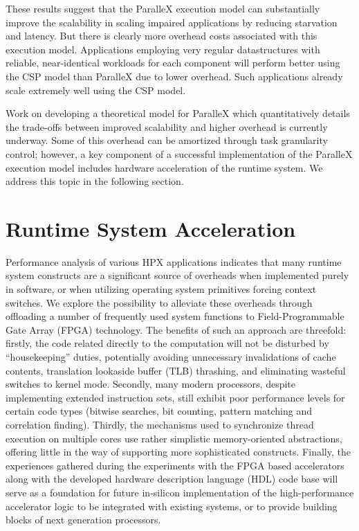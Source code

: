 \documentclass{revtex4}
\begin{document}
These results suggest that the ParalleX execution model can substantially improve the scalability in 
scaling impaired applications by reducing starvation and latency.  But there is clearly more
overhead costs associated with this execution model.  Applications employing very regular datastructures
with reliable, near-identical workloads for each component will perform better using the CSP model than
ParalleX due to lower overhead.  Such applications already scale extremely well using the CSP model.

Work on developing a theoretical model for ParalleX
which quantitatively details the trade-offs between improved scalability and higher overhead is
currently underway.  Some of this overhead can be amortized through task granularity control; however, 
a key component of a successful implementation of the ParalleX execution model 
includes hardware acceleration of the runtime system.  We address this topic in the following section.

\section{Runtime System Acceleration}
\label{sec:implications}

Performance analysis of various HPX applications indicates that many runtime
system constructs are a significant source of overheads when implemented
purely in software, or when utilizing operating system primitives forcing
context switches.  We explore the possibility to alleviate these overheads through offloading a number of
frequently used system functions to Field-Programmable Gate Array (FPGA) technology.
The benefits of such an approach are threefold: firstly, the code related
directly to the computation will not be disturbed by ``housekeeping'' duties,
potentially avoiding unnecessary invalidations of cache contents, translation 
lookaside buffer (TLB)
thrashing, and eliminating wasteful switches to kernel mode.
Secondly, many modern processors, despite implementing extended instruction
sets, still exhibit poor performance levels for certain code types
(bitwise searches, bit counting, pattern matching and correlation finding).
Thirdly, the mechanisms used to synchronize thread execution on multiple cores
use rather simplistic memory-oriented abstractions, offering little in the way
of supporting more sophisticated constructs.
Finally, the experiences gathered during the experiments with the FPGA
based accelerators along with the developed hardware description language (HDL) code base
will serve as a foundation for future in-silicon implementation of 
the high-performance accelerator logic to be integrated with 
existing systems, or to provide building blocks of next generation
processors.
\end{document}
